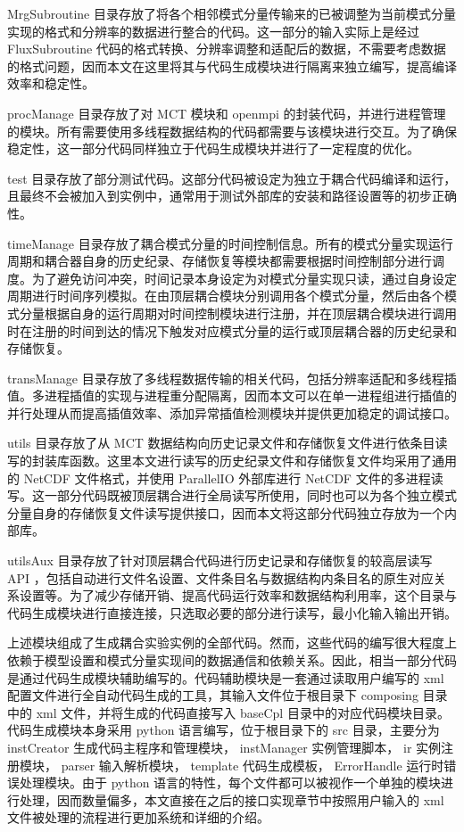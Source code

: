 MrgSubroutine 目录存放了将各个相邻模式分量传输来的已被调整为当前模式分量实现的格式和分辨率的数据进行整合的代码。这一部分的输入实际上是经过 FluxSubroutine 代码的格式转换、分辨率调整和适配后的数据，不需要考虑数据的格式问题，因而本文在这里将其与代码生成模块进行隔离来独立编写，提高编译效率和稳定性。

procManage 目录存放了对 MCT 模块和 openmpi 的封装代码，并进行进程管理的模块。所有需要使用多线程数据结构的代码都需要与该模块进行交互。为了确保稳定性，这一部分代码同样独立于代码生成模块并进行了一定程度的优化。

test 目录存放了部分测试代码。这部分代码被设定为独立于耦合代码编译和运行，且最终不会被加入到实例中，通常用于测试外部库的安装和路径设置等的初步正确性。

timeManage 目录存放了耦合模式分量的时间控制信息。所有的模式分量实现运行周期和耦合器自身的历史纪录、存储恢复等模块都需要根据时间控制部分进行调度。为了避免访问冲突，时间记录本身设定为对模式分量实现只读，通过自身设定周期进行时间序列模拟。在由顶层耦合模块分别调用各个模式分量，然后由各个模式分量根据自身的运行周期对时间控制模块进行注册，并在顶层耦合模块进行调用时在注册的时间到达的情况下触发对应模式分量的运行或顶层耦合器的历史纪录和存储恢复。

transManage 目录存放了多线程数据传输的相关代码，包括分辨率适配和多线程插值。多进程插值的实现与进程重分配隔离，因而本文可以在单一进程组进行插值的并行处理从而提高插值效率、添加异常插值检测模块并提供更加稳定的调试接口。

utils 目录存放了从 MCT 数据结构向历史记录文件和存储恢复文件进行依条目读写的封装库函数。这里本文进行读写的历史纪录文件和存储恢复文件均采用了通用的 NetCDF 文件格式，并使用 ParallelIO 外部库进行 NetCDF 文件的多进程读写。这一部分代码既被顶层耦合进行全局读写所使用，同时也可以为各个独立模式分量自身的存储恢复文件读写提供接口，因而本文将这部分代码独立存放为一个内部库。

utilsAux 目录存放了针对顶层耦合代码进行历史记录和存储恢复的较高层读写 API ，包括自动进行文件名设置、文件条目名与数据结构内条目名的原生对应关系设置等。为了减少存储开销、提高代码运行效率和数据结构利用率，这个目录与代码生成模块进行直接连接，只选取必要的部分进行读写，最小化输入输出开销。

上述模块组成了生成耦合实验实例的全部代码。然而，这些代码的编写很大程度上依赖于模型设置和模式分量实现间的数据通信和依赖关系。因此，相当一部分代码是通过代码生成模块辅助编写的。代码辅助模块是一套通过读取用户编写的 xml 配置文件进行全自动代码生成的工具，其输入文件位于根目录下 composing 目录中的 xml 文件，并将生成的代码直接写入 baseCpl 目录中的对应代码模块目录。代码生成模块本身采用 python 语言编写，位于根目录下的 src 目录，主要分为 instCreator 生成代码主程序和管理模块， instManager 实例管理脚本， ir 实例注册模块， parser 输入解析模块， template 代码生成模板， ErrorHandle 运行时错误处理模块。由于 python 语言的特性，每个文件都可以被视作一个单独的模块进行处理，因而数量偏多，本文直接在之后的接口实现章节中按照用户输入的 xml 文件被处理的流程进行更加系统和详细的介绍。

